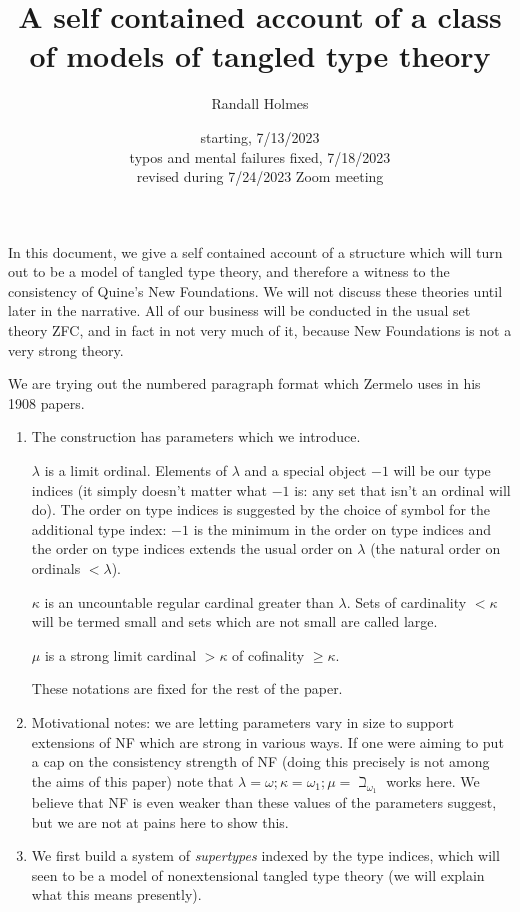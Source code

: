 \documentclass[12pt]{article}
\title{A self contained account of a class of models of tangled type theory}
\author{Randall Holmes}
\date{starting, 7/13/2023\\
typos and mental failures fixed, 7/18/2023\\
revised during 7/24/2023 Zoom meeting}
\begin{document}
\maketitle

In this document, we give a self contained account of a structure which will turn out to be a model of tangled type theory, and therefore a witness to the consistency of Quine's New Foundations.
We will not discuss these theories until later in the narrative.  All of our business will be conducted in the usual set theory ZFC, and in fact in not very much of it, because New Foundations is not a very strong theory.

We are trying out the numbered paragraph format which Zermelo uses in his 1908 papers.

\begin{enumerate}

\item The construction has parameters which we introduce.

$\lambda$ is a limit ordinal.  Elements of $\lambda$ and a special object $-1$ will be our type indices (it simply doesn't matter what $-1$ is:  any set that isn't an ordinal will do).  The order on type indices is suggested by the choice of symbol for the additional type index:  $-1$ is the minimum in the order on type indices and the order on type indices extends the usual order on $\lambda$ (the natural order on ordinals $<\lambda$).

$\kappa$ is an uncountable regular cardinal greater than $\lambda$.  Sets of cardinality $<\kappa$ will be termed small and sets which are not small are called large.

$\mu$ is a strong limit cardinal $>\kappa$ of cofinality $\geq \kappa$.

These notations are fixed for the rest of the paper.

\item  Motivational notes:  we are letting parameters vary in size to support extensions of NF which are strong in various ways.  If one were aiming to put a cap on the consistency strength of NF (doing this precisely is not among the aims of this paper) note that $\lambda = \omega; \kappa = \omega_1; \mu = \beth_{\omega_1}$ works here.  We believe that NF is even weaker than these values of the parameters suggest, but we are not at pains here to show this.

\item We first build a system of {\em supertypes\/} indexed by the type indices, which will seen to be a model of nonextensional tangled type theory (we will explain what this means presently).


\end{enumerate}
\end{document}
